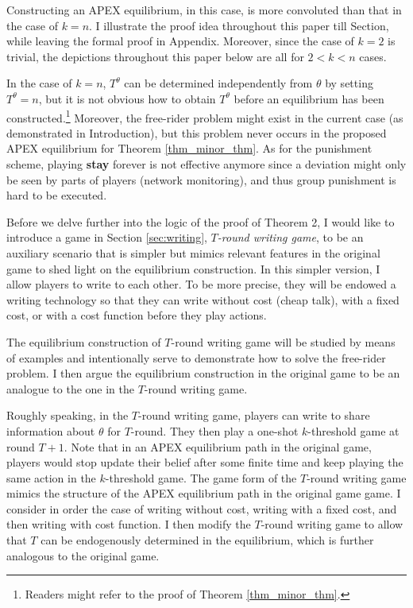 \documentclass[12pt,letter]{article}
\theoremstyle{definition}
\theoremstyle{remark}
\theoremstyle{claim}
\begin{document}
Constructing an APEX equilibrium, in this case, is more convoluted than that in the case of $k=n$. I illustrate the proof idea throughout this paper till Section, while leaving the formal proof in Appendix. Moreover, since the case of $k=2$ is trivial, the depictions throughout this paper below are all for $2<k<n$ cases. 

In the case of $k=n$, $T^{\theta}$ can be determined independently from $\theta$ by setting $T^{\theta}=n$, but it is not obvious how to obtain $T^{\theta}$ before an equilibrium has been constructed.\footnote{Readers might refer to the proof of Theorem \ref{thm_minor_thm}.} 
Moreover, the free-rider problem might exist in the current case (as demonstrated in Introduction), but this problem never occurs in the proposed APEX equilibrium for Theorem \ref{thm_minor_thm}. As for the punishment scheme, playing \textbf{stay} forever is not effective anymore since a deviation might only be seen by parts of players (network monitoring), and thus group punishment is hard to be executed.

Before we delve further into the logic of the proof of Theorem 2, I would like to introduce a game in Section \ref{sec:writing}, \textit{$T$-round writing game}, to be an auxiliary scenario that is simpler but mimics relevant features in the original game to shed light on the equilibrium construction. In this simpler version, I allow players to write to each other. To be more precise, they will be endowed a writing technology so that they can write without cost (cheap talk), with a fixed cost, or with a cost function before they play actions. 
 
The equilibrium construction of $T$-round writing game will be studied by means of examples and intentionally serve to demonstrate how to solve the free-rider problem. I then argue the equilibrium construction in the original game to be an analogue to the one in the $T$-round writing game. 

Roughly speaking, in the $T$-round writing game, players can write to share information about $\theta$ for $T$-round. They then play a one-shot $k$-threshold game at round $T+1$. Note that in an APEX equilibrium path in the original game, players would stop update their belief after some finite time and keep playing the same action in the $k$-threshold game. The game form of the $T$-round writing game mimics the structure of the APEX equilibrium path in the original game game. I consider in order the case of writing without cost, writing with a fixed cost, and then writing with cost function. I then modify the $T$-round writing game to allow that $T$ can be endogenously determined in the equilibrium, which is further analogous to the original game.  
\end{document}

